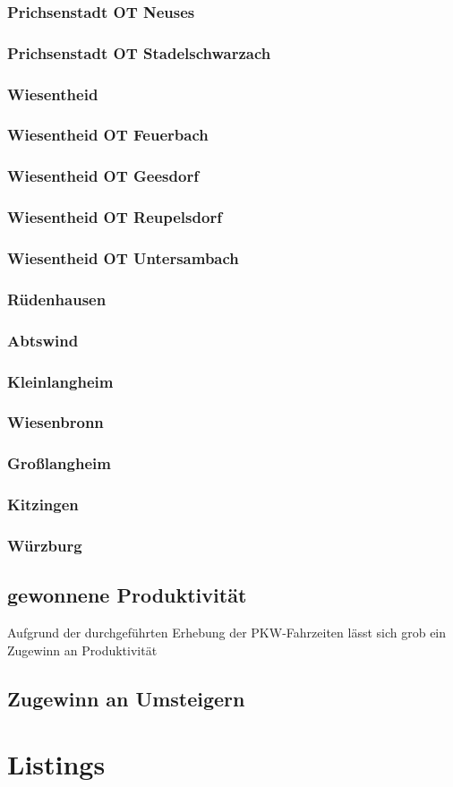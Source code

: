 \documentclass[fontsize=12pt,a4paper]{scrreprt}
\begin{document}
\subsection{Prichsenstadt OT Neuses}
\subsection{Prichsenstadt OT Stadelschwarzach}
\subsection{Wiesentheid}
\subsection{Wiesentheid OT Feuerbach}
\subsection{Wiesentheid OT Geesdorf}
\subsection{Wiesentheid OT Reupelsdorf}
\subsection{Wiesentheid OT Untersambach}
\subsection{Rüdenhausen}
\subsection{Abtswind}
\subsection{Kleinlangheim}
\subsection{Wiesenbronn}
\subsection{Großlangheim}
\subsection{Kitzingen}
\subsection{Würzburg}


\section{gewonnene Produktivität}
Aufgrund der durchgeführten Erhebung der PKW-Fahrzeiten lässt sich grob ein Zugewinn an Produktivität

\section{Zugewinn an Umsteigern}


\chapter{Listings}

\end{document}
